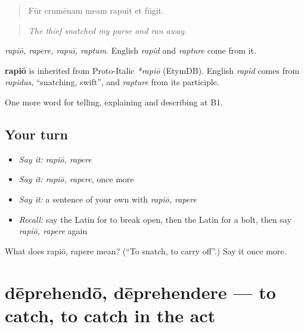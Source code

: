 \begin{quote}
Fūr crumēnam meam rapuit et fūgit.
\end{quote}

\begin{quote}
\emph{The thief snatched my purse and ran away.}
\end{quote}

\emph{rapiō, rapere, rapuī, raptum}. English \emph{rapid} and \emph{rapture} come from it.

\begin{cousinweb}
\textbf{rapiō} is inherited from Proto-Italic \emph{*rapiō} (EtymDB). English \emph{rapid} comes from \emph{rapidus}, \textquotedblleft{}snatching, swift\textquotedblright{}, and \emph{rapture} from its participle.
\end{cousinweb}

\begin{grammarlens}[title={What you've built}]
One more word for telling, explaining and describing at B1.
\end{grammarlens}

\subsection*{Your turn}
\begin{itemize}
\raggedright
  \item \emph{Say it:} \emph{rapiō, rapere}
  \item \emph{Say it:} \emph{rapiō, rapere}, once more
  \item \emph{Say it:} a sentence of your own with \emph{rapiō, rapere}
  \item \emph{Recall:} say the Latin for to break open, then the Latin for a bolt, then say \emph{rapiō, rapere} again
\end{itemize}

\begin{tcolorbox}[breakable,colback=teal!4,colframe=teal!35!black,title={Before you move on}]
What does rapiō, rapere mean? (\textquotedblleft{}To snatch, to carry off\textquotedblright{}.) Say it once more.
\end{tcolorbox}
\section[dēprehendō, dēprehendere]{dēprehendō, dēprehendere — to catch, to catch in the act}

\label{lesson:LA-C304-deprehendo}



